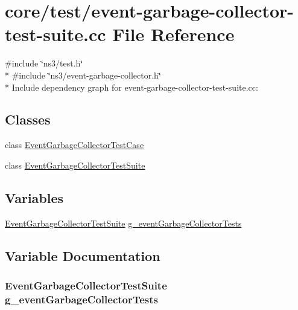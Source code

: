 \hypertarget{event-garbage-collector-test-suite_8cc}{}\section{core/test/event-\/garbage-\/collector-\/test-\/suite.cc File Reference}
\label{event-garbage-collector-test-suite_8cc}
{\ttfamily \#include \char`\"{}ns3/test.\+h\char`\"{}}\\*
{\ttfamily \#include \char`\"{}ns3/event-\/garbage-\/collector.\+h\char`\"{}}\\*
Include dependency graph for event-\/garbage-\/collector-\/test-\/suite.cc\+:
\subsection*{Classes}
\begin{DoxyCompactItemize}
\item 
class \hyperlink{classEventGarbageCollectorTestCase}{Event\+Garbage\+Collector\+Test\+Case}
\item 
class \hyperlink{classEventGarbageCollectorTestSuite}{Event\+Garbage\+Collector\+Test\+Suite}
\end{DoxyCompactItemize}
\subsection*{Variables}
\begin{DoxyCompactItemize}
\item 
\hyperlink{classEventGarbageCollectorTestSuite}{Event\+Garbage\+Collector\+Test\+Suite} \hyperlink{event-garbage-collector-test-suite_8cc_afce7d92a8c331a90192cc506a72be6f7}{g\+\_\+event\+Garbage\+Collector\+Tests}
\end{DoxyCompactItemize}


\subsection{Variable Documentation}
\subsubsection[{\texorpdfstring{g\+\_\+event\+Garbage\+Collector\+Tests}{g_eventGarbageCollectorTests}}]{\setlength{\rightskip}{0pt plus 5cm} {\bf Event\+Garbage\+Collector\+Test\+Suite}  g\+\_\+event\+Garbage\+Collector\+Tests\hspace{0.3cm}{\ttfamily [static]}}\hypertarget{event-garbage-collector-test-suite_8cc_afce7d92a8c331a90192cc506a72be6f7}{}\label{event-garbage-collector-test-suite_8cc_afce7d92a8c331a90192cc506a72be6f7}
